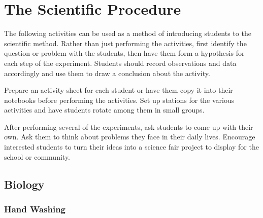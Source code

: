 \chapter{The Scientific Procedure}

The following activities can be used as a method of introducing students to the scientific method. Rather than just performing the activities, first identify the question or problem with the students, then have them form a hypothesis for each step of the experiment. Students should record observations and data accordingly and use them to draw a conclusion about the activity.

Prepare an activity sheet for each student or have them copy it into their notebooks before performing the activities. Set up stations for the various activities and have students rotate among them in small groups.

After performing several of the experiments, ask students to come up with their own. Ask them to think about problems they face in their daily lives. Encourage interested students to turn their ideas into a science fair project to display for the school or community.


\section{Biology}


\subsection{Hand Washing}


